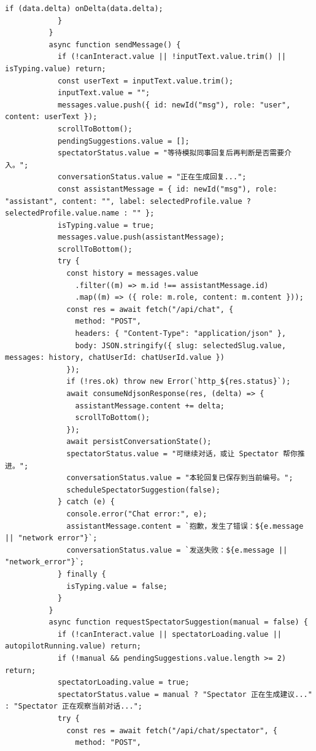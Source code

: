 \documentclass[12pt,a4paper]{article}
\begin{document}
\begin{Verbatim}[fontsize=\footnotesize]
              if (data.delta) onDelta(data.delta);
            }
          }
          async function sendMessage() {
            if (!canInteract.value || !inputText.value.trim() || isTyping.value) return;
            const userText = inputText.value.trim();
            inputText.value = "";
            messages.value.push({ id: newId("msg"), role: "user", content: userText });
            scrollToBottom();
            pendingSuggestions.value = [];
            spectatorStatus.value = "等待模拟同事回复后再判断是否需要介入。";
            conversationStatus.value = "正在生成回复...";
            const assistantMessage = { id: newId("msg"), role: "assistant", content: "", label: selectedProfile.value ? selectedProfile.value.name : "" };
            isTyping.value = true;
            messages.value.push(assistantMessage);
            scrollToBottom();
            try {
              const history = messages.value
                .filter((m) => m.id !== assistantMessage.id)
                .map((m) => ({ role: m.role, content: m.content }));
              const res = await fetch("/api/chat", {
                method: "POST",
                headers: { "Content-Type": "application/json" },
                body: JSON.stringify({ slug: selectedSlug.value, messages: history, chatUserId: chatUserId.value })
              });
              if (!res.ok) throw new Error(`http_${res.status}`);
              await consumeNdjsonResponse(res, (delta) => {
                assistantMessage.content += delta;
                scrollToBottom();
              });
              await persistConversationState();
              spectatorStatus.value = "可继续对话，或让 Spectator 帮你推进。";
              conversationStatus.value = "本轮回复已保存到当前编号。";
              scheduleSpectatorSuggestion(false);
            } catch (e) {
              console.error("Chat error:", e);
              assistantMessage.content = `抱歉，发生了错误：${e.message || "network error"}`;
              conversationStatus.value = `发送失败：${e.message || "network_error"}`;
            } finally {
              isTyping.value = false;
            }
          }
          async function requestSpectatorSuggestion(manual = false) {
            if (!canInteract.value || spectatorLoading.value || autopilotRunning.value) return;
            if (!manual && pendingSuggestions.value.length >= 2) return;
            spectatorLoading.value = true;
            spectatorStatus.value = manual ? "Spectator 正在生成建议..." : "Spectator 正在观察当前对话...";
            try {
              const res = await fetch("/api/chat/spectator", {
                method: "POST",
\end{Verbatim}
\end{document}
